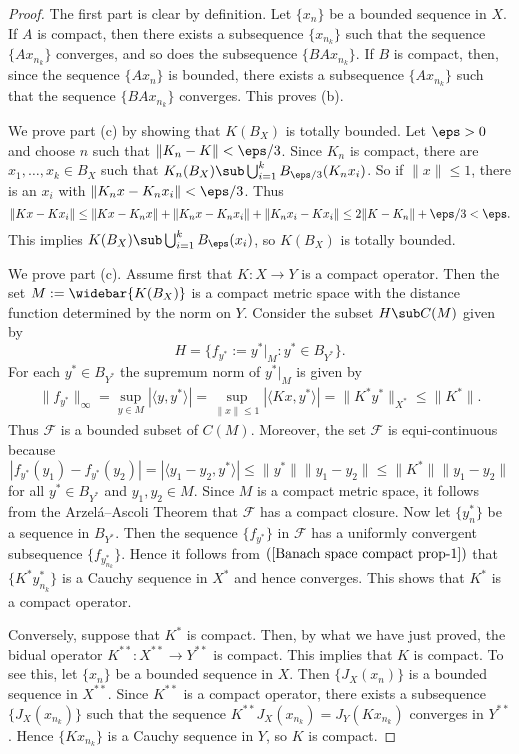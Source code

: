 \begin{proof}
The first part is clear by definition. Let $\{x_n\}$ be a bounded sequence in $X$. If $A$ is compact, then there exists a subsequence $\{x_{n_k}\}$ such that the sequence $\{Ax_{n_k}\}$ converges, and so does the subsequence $\{BAx_{n_k}\}$. If $B$ is compact, then, since the sequence $\{Ax_n\}$ is bounded, there exists a subsequence $\{Ax_{n_k}\}$ such that the sequence $\{BAx_{n_k}\}$ converges. This proves (b).\par
We prove part (c) by showing that $K(B_X)$ is totally bounded. Let $\eps>0$ and choose $n$ such that $\|K_n-K\|<\eps/3$. Since $K_n$ is compact, there are $x_1,\dots,x_k\in B_X$ such that $K_n(B_X)\sub\bigcup_{i=1}^{k}B_{\eps/3}(K_nx_i)$. So if $\|x\|\leq 1$, there is an $x_i$ with $\|K_nx-K_nx_i\|<\eps/3$. Thus
\[\|Kx-Kx_i\|\leq\|Kx-K_nx\|+\|K_nx-K_nx_i\|+\|K_nx_i-Kx_i\|\leq 2\|K-K_n\|+\eps/3<\eps.\]
This implies $K(B_X)\sub\bigcup_{i=1}^{k}B_{\eps}(x_i)$, so $K(B_X)$ is totally bounded.\par
We prove part (c). Assume first that $K:X\to Y$ is a compact operator.
Then the set $M:=\widebar{K(B_X)}$ is a compact metric space with the distance function determined by the norm on $Y$. Consider the subset $H\sub C(M)$ given by
\[H=\{f_{y^*}:=y^*|_{M}:y^*\in B_{Y^*}\}.\]
For each $y^*\in B_{Y^*}$ the supremum norm of $y^*|_{M}$ is given by
\begin{align}\label{Banach space compact prop-1}
\|f_{y^*}\|_\infty=\sup_{y\in M}|\langle y,y^*\rangle|=\sup_{\|x\|\leq 1}|\langle Kx,y^*\rangle|=\|K^*y^*\|_{X^*}\leq\|K^*\|.
\end{align}
Thus $\mathscr{F}$ is a bounded subset of $C(M)$. Moreover, the set $\mathscr{F}$ is equi-continuous because
\[|f_{y^*}(y_1)-f_{y^*}(y_2)|=|\langle y_1-y_2,y^*\rangle|\leq\|y^*\|\|y_1-y_2\|\leq\|K^*\|\|y_1-y_2\|\]
for all $y^*\in B_{Y^*}$ and $y_1,y_2\in M$. Since $M$ is a compact metric space, it follows from the Arzel\'a–Ascoli Theorem that $\mathscr{F}$ has a compact closure. Now let $\{y^*_n\}$ be a sequence in $B_{Y^*}$. Then the sequence $\{f_{y^*}\}$ in $\mathscr{F}$ has a uniformly convergent subsequence $\{f_{y^*_{n_k}}\}$. Hence it follows from $(\ref{Banach space compact prop-1})$ that $\{K^*y^*_{n_k}\}$ is a Cauchy sequence in $X^*$ and hence converges. This shows that $K^*$ is a compact operator.\par
Conversely, suppose that $K^*$ is compact. Then, by what we have just proved, the bidual operator $K^{**}:X^{**}\to Y^{**}$ is compact. This implies that $K$ is compact. To see this, let $\{x_n\}$ be a bounded sequence in $X$. Then $\{J_X(x_n)\}$ is a bounded sequence in $X^{**}$. Since $K^{**}$ is a compact operator, there exists a subsequence $\{J_X(x_{n_k})\}$ such that the sequence $K^{**}J_X(x_{n_k})=J_Y(Kx_{n_k})$ converges in $Y^{**}$. Hence $\{Kx_{n_k}\}$ is a Cauchy sequence in $Y$, so $K$ is compact.
\end{proof}
